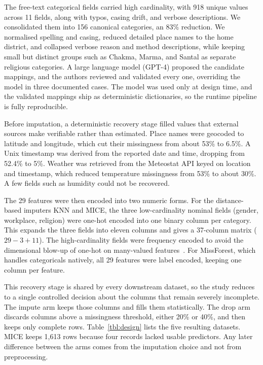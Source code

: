 \documentclass[conference]{IEEEtran}
\begin{document}
The free-text categorical fields carried high cardinality, with 918 unique values across 11 fields, along with typos, casing drift, and verbose descriptions. We consolidated them into 156 canonical categories, an 83\% reduction. We normalised spelling and casing, reduced detailed place names to the home district, and collapsed verbose reason and method descriptions, while keeping small but distinct groups such as Chakma, Marma, and Santal as separate religious categories. A large language model (GPT-4) proposed the candidate mappings, and the authors reviewed and validated every one, overriding the model in three documented cases. The model was used only at design time, and the validated mappings ship as deterministic dictionaries, so the runtime pipeline is fully reproducible.

Before imputation, a deterministic recovery stage filled values that external sources make verifiable rather than estimated. Place names were geocoded to latitude and longitude, which cut their missingness from about 53\% to 6.5\%. A Unix timestamp was derived from the reported date and time, dropping from 52.4\% to 5\%. Weather was retrieved from the Meteostat API keyed on location and timestamp, which reduced temperature missingness from 53\% to about 30\%. A few fields such as humidity could not be recovered.

The 29 features were then encoded into two numeric forms. For the distance-based imputers KNN and MICE, the three low-cardinality nominal fields (gender, workplace, religion) were one-hot encoded into one binary column per category. This expands the three fields into eleven columns and gives a 37-column matrix ($29-3+11$). The high-cardinality fields were frequency encoded to avoid the dimensional blow-up of one-hot on many-valued features~\cite{pargent2022highcardinality}. For MissForest, which handles categoricals natively, all 29 features were label encoded, keeping one column per feature.

This recovery stage is shared by every downstream dataset, so the study reduces to a single controlled decision about the columns that remain severely incomplete. The impute arm keeps those columns and fills them statistically. The drop arm discards columns above a missingness threshold, either 20\% or 40\%, and then keeps only complete rows. Table~\ref{tbl:design} lists the five resulting datasets. MICE keeps 1{,}613 rows because four records lacked usable predictors. Any later difference between the arms comes from the imputation choice and not from preprocessing.
\end{document}
